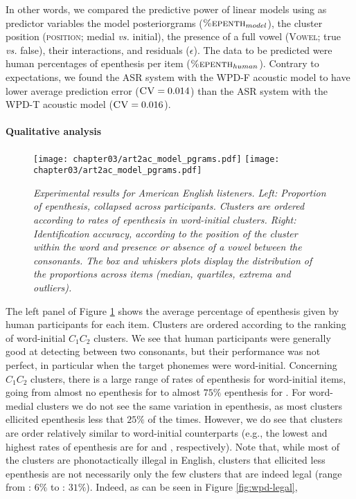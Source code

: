 {  In other words, we compared the predictive power of linear models using as predictor variables the model posteriorgrams ($\textsc{\%epenth}_{model}$), the cluster position (\textsc{position}; medial \textit{vs.} initial), the presence of a full vowel (\textsc{Vowel}; true \textit{vs.} false), their interactions, and residuals ($\epsilon$). The data to be predicted were human percentages of epenthesis per item ($\textsc{\%epenth}_{human}$).
  Contrary to expectations, we found the ASR system with the WPD-F acoustic model to have lower average prediction error ($\textsc{CV} = 0.014$) than the ASR system with the WPD-T acoustic model ($\textsc{CV} = 0.016$).
  
\paragraph{Qualitative analysis}

\begin{figure}[htb!]
  \centering
    \texttt{[image: chapter03/art2ac\_model\_pgrams.pdf]}%
    \hspace{0.5cm}
    \texttt{[image: chapter03/art2ac\_model\_pgrams.pdf]}
    \caption{\textit{Experimental results for American English listeners.
      Left: Proportion of epenthesis, collapsed across participants. Clusters are ordered according to rates of epenthesis in word-initial clusters. 
      Right: Identification accuracy, according to the position of the cluster within the word and presence or absence of a vowel between the consonants. The box and whiskers plots display the distribution of the proportions across items (median, quartiles, extrema and outliers).}}
    \label{fig:wpd-hum}
  \end{figure}

The left panel of Figure \ref{fig:wpd-hum} shows the average percentage of epenthesis given by human participants for each item. Clusters are ordered according to the ranking of word-initial $C_{1}C_{2}$ clusters. We see that human participants were generally good at detecting \textipa{[@]} between two consonants, but their performance was not perfect, in particular when the target phonemes were word-initial. Concerning $C_{1}C_{2}$ clusters, there is a large range of rates of epenthesis for word-initial items, going from almost no epenthesis for  to almost $75\%$ epenthesis for . For word-medial clusters we do not see the same variation in epenthesis, as most clusters ellicited epenthesis less that $25\%$ of the times. However, we do see that clusters are order relatively similar to word-initial counterparts (e.g., the lowest and highest rates of epenthesis are for  and , respectively). Note that, while most of the clusters are phonotactically illegal in English, clusters that ellicited less epenthesis are not necessarily only the few clusters that are indeed legal (range from : $6\%$ to : $31\%$). Indeed, as can be seen in Figure \ref{fig:wpd-legal},  

}
